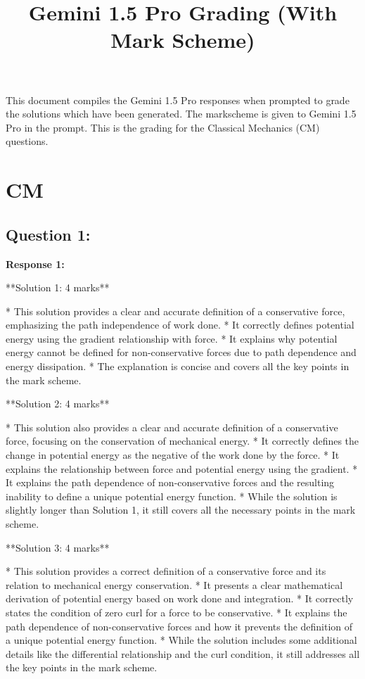 \documentclass[a4paper,11pt]{article}
\title{Gemini 1.5 Pro Grading (With Mark Scheme)}
\begin{document}
\maketitle
This document compiles the Gemini 1.5 Pro responses when prompted to grade the solutions which have been generated. The markscheme is given to Gemini 1.5 Pro in the prompt. This is the grading for the Classical Mechanics (CM) questions. 

\section{CM}
\subsection*{Question 1:}

\textbf{Response 1:}

**Solution 1: 4 marks**

* This solution provides a clear and accurate definition of a conservative force, emphasizing the path independence of work done.
* It correctly defines potential energy using the gradient relationship with force.
* It explains why potential energy cannot be defined for non-conservative forces due to path dependence and energy dissipation.
* The explanation is concise and covers all the key points in the mark scheme.

**Solution 2: 4 marks**

* This solution also provides a clear and accurate definition of a conservative force, focusing on the conservation of mechanical energy.
* It correctly defines the change in potential energy as the negative of the work done by the force.
* It explains the relationship between force and potential energy using the gradient.
* It explains the path dependence of non-conservative forces and the resulting inability to define a unique potential energy function.
* While the solution is slightly longer than Solution 1, it still covers all the necessary points in the mark scheme.

**Solution 3: 4 marks**

* This solution provides a correct definition of a conservative force and its relation to mechanical energy conservation.
* It presents a clear mathematical derivation of potential energy based on work done and integration.
* It correctly states the condition of zero curl for a force to be conservative.
* It explains the path dependence of non-conservative forces and how it prevents the definition of a unique potential energy function.
* While the solution includes some additional details like the differential relationship and the curl condition, it still addresses all the key points in the mark scheme.
\end{document}
